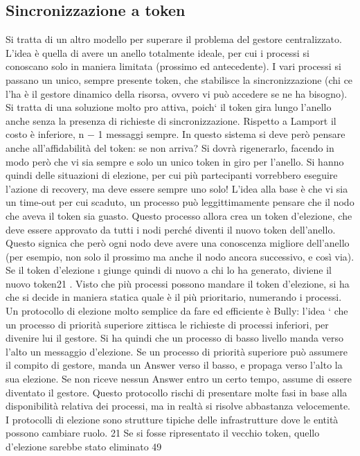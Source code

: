 \subsection{Sincronizzazione a token}
Si tratta di un altro modello per superare il problema del gestore centralizzato. L'idea è quella di avere un anello
totalmente ideale, per cui i processi si conoscano solo in maniera limitata (prossimo ed antecedente). I vari processi
si passano un unico, sempre presente token, che stabilisce la sincronizzazione
(chi ce l'ha è il gestore dinamico della risorsa, ovvero vi può accedere se ne
ha bisogno). Si tratta di una soluzione molto pro attiva, poich` il token gira
lungo l'anello anche senza la presenza di richieste di sincronizzazione. Rispetto
a Lamport il costo è inferiore, n $-$ 1 messaggi sempre.
In questo sistema si deve però pensare anche all'affidabilità del token: se
non arriva? Si dovrà rigenerarlo, facendo in modo però che vi sia sempre e solo
un unico token in giro per l'anello. Si hanno quindi delle situazioni di elezione,
per cui più partecipanti vorrebbero eseguire l'azione di recovery, ma deve essere
sempre uno solo! L'idea alla base è che vi sia un time-out per cui scaduto, un
processo può leggittimamente pensare che il nodo che aveva il token sia guasto.
Questo processo allora crea un token d'elezione, che deve essere approvato da
tutti i nodi perché diventi il nuovo token dell'anello. Questo signica che però
ogni nodo deve avere una conoscenza migliore dell'anello (per esempio, non solo
il prossimo ma anche il nodo ancora successivo, e così via). Se il token d'elezione
\i{}
giunge quindi di nuovo a chi lo ha generato, diviene il nuovo token21 . Visto che
più processi possono mandare il token d'elezione, si ha che si decide in maniera
statica quale è il più prioritario, numerando i processi.
Un protocollo di elezione molto semplice da fare ed efficiente è Bully: l'idea
` che un processo di priorità superiore zittisca le richieste di processi inferiori,
per divenire lui il gestore. Si ha quindi che un processo di basso livello manda
verso l'alto un messaggio d'elezione. Se un processo di priorità superiore può
assumere il compito di gestore, manda un Answer verso il basso, e propaga verso
l'alto la sua elezione. Se non riceve nessun Answer entro un certo tempo, assume
di essere diventato il gestore. Questo protocollo rischi di presentare molte fasi
in base alla disponibilità relativa dei processi, ma in realtà si risolve abbastanza
velocemente. I protocolli di elezione sono strutture tipiche delle infrastrutture
dove le entità possono cambiare ruolo.
21 Se
si fosse ripresentato il vecchio token, quello d'elezione sarebbe stato eliminato
49
